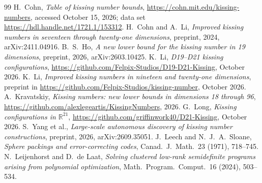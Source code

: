 \documentclass[11pt]{article}
\numberwithin{equation}{section}
\theoremstyle{definition}
\theoremstyle{remark}
\newcommand{\R}{\mathbb R}
\begin{document}
\begin{thebibliography}{99}
 H.~Cohn, \emph{Table of kissing number bounds}, \url{https://cohn.mit.edu/kissing-numbers}, accessed October 15, 2026; data set \url{https://hdl.handle.net/1721.1/153312}.
 H.~Cohn and A.~Li, \emph{Improved kissing numbers in seventeen through twenty-one dimensions}, preprint, 2024, arXiv:2411.04916.
 B.~S.~Ho, \emph{A new lower bound for the kissing number in 19 dimensions}, preprint, 2026, arXiv:2603.10425.
 K.~Li, \emph{D19--D21 kissing configurations}, \url{https://github.com/Felpix-Studios/D19-D21-Kissing}, October 2026.
 K.~Li, \emph{Improved kissing numbers in nineteen and twenty-one dimensions}, preprint in \url{https://github.com/Felpix-Studios/kissing-number}, October 2026.
 A.~Kravatskiy, \emph{Kissing numbers: new lower bounds in dimensions 18 through 96}, \url{https://github.com/alexlegeartis/KissingNumbers}, 2026.
 G.~Long, \emph{Kissing configurations in $\R^{21}$}, \url{https://github.com/griffinwork40/D21-Kissing}, October 2026.
 S.~Yang et al., \emph{Large-scale autonomous discovery of kissing number constructions}, preprint, 2026, arXiv:2609.35051.
 J.~Leech and N.~J.~A.~Sloane, \emph{Sphere packings and error-correcting codes}, Canad.\ J.\ Math.\ 23 (1971), 718--745.
 N.~Leijenhorst and D.~de Laat, \emph{Solving clustered low-rank semidefinite programs arising from polynomial optimization}, Math.\ Program.\ Comput.\ 16 (2024), 503--534.
\end{thebibliography}
\end{document}
